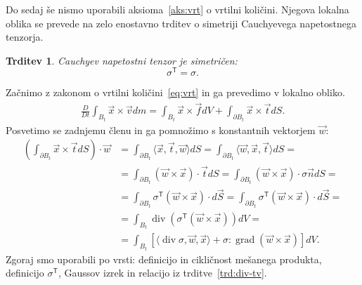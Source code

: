 \documentclass[12pt,a4paper]{article}
\theoremstyle{definition} %
\theoremstyle{plain} %
\newtheorem{trditev}[definicija]{Trditev}
\numberwithin{equation}{section}
\newcommand{\T}{\mathsf{T}}
\renewcommand{\div}{\operatorname{div}}
\newcommand{\grad}{\operatorname{grad}}
\newcommand{\DD}[2]{\ensuremath{\frac{D #1}{D #2}}}
\newcommand{\DDt}[1]{\DD{#1}{t}}
\newcommand{\vv}{\vec{v}}
\newcommand{\vt}{\vec{t}}
\newcommand{\vw}{\vec{w}}
\newcommand{\vn}{\vec{n}}
\newcommand{\vf}{\vec{f}}
\newcommand{\vx}{\vec{x}}
\newcommand{\ts}{\sigma}
\begin{document}
Do sedaj še nismo uporabili aksioma~\ref{aks:vrt} o vrtilni količini.
Njegova lokalna oblika se prevede na zelo enostavno trditev o simetriji
Cauchyevega napetostnega tenzorja.
\begin{trditev}
  \label{trd:sigma-symmetric}
  Cauchyev napetostni tenzor je simetričen:
  \[ \ts^\T = \ts. \]
\end{trditev}
\proof
Začnimo z zakonom o vrtilni količini~\eqref{eq:vrt} in ga prevedimo v lokalno
obliko.
\begin{align*}
  \DDt{}\int_{B_t}\vx \times \vv dm = \int_{B_t} \vx \times \vf dV +
  \int_{\partial B_t} \vx\times\vt dS.
\end{align*}
Posvetimo se zadnjemu členu in ga pomnožimo s konstantnih vektorjem $\vw$:
\begin{align*}
\left(\int_{\partial B_t} \vx \times \vt dS\right)\cdot \vw  &=
  \int_{\partial B_t} \langle \vx, \vt, \vw \rangle dS =
  \int_{\partial B_t} \langle \vw, \vx, \vt \rangle dS = \\ &=
  \int_{\partial B_t} (\vw \times \vx) \cdot \vt dS =
  \int_{\partial B_t} (\vw \times \vx) \cdot \ts\vn dS = \\ &=
  \int_{\partial B_t} \ts^\T(\vw \times \vx) \cdot d\vec{S} =
  \int_{\partial B_t} \ts^\T(\vw \times \vx) \cdot d\vec{S} = \\ &=
  \int_{B_t} \div (\ts^\T(\vw \times \vx)) dV = \\ &=
\int_{B_t} [\langle \div \ts, \vw, \vx\rangle +  \ts : \grad (\vw \times \vx)] dV.
\end{align*}
Zgoraj smo uporabili po vrsti: definicijo in cikličnost mešanega produkta, definicijo
$\ts^\T$, Gaussov izrek in relacijo iz trditve~\ref{trd:div-tv}.
\end{document}
